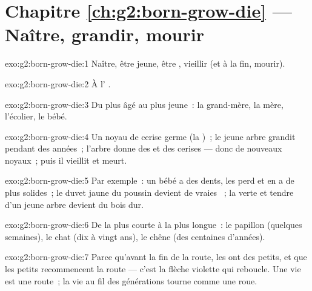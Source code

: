 \section*{Chapitre \ref{ch:g2:born-grow-die} --- Naître, grandir, mourir}

\begin{solution}{exo:g2:born-grow-die:1}
Naître, être jeune, être , vieillir (et à la fin, mourir).
\end{solution}

\begin{solution}{exo:g2:born-grow-die:2}
À l' .
\end{solution}

\begin{solution}{exo:g2:born-grow-die:3}
Du plus âgé au plus jeune~: la grand-mère, la mère, l'écolier, le
bébé.
\end{solution}

\begin{solution}{exo:g2:born-grow-die:4}
Un noyau de cerise germe (la )~; le jeune arbre grandit
pendant des années~; l'arbre  donne des  et des cerises
--- donc de nouveaux noyaux~; puis il vieillit et meurt.
\end{solution}

\begin{solution}{exo:g2:born-grow-die:5}
Par exemple~: un bébé a des dents, les perd et en a de plus
solides~; le duvet jaune du poussin devient de vraies ~; la
 verte et tendre d'un jeune arbre devient du bois dur.
\end{solution}

\begin{solution}{exo:g2:born-grow-die:6}
De la plus courte à la plus longue~: le papillon (quelques
semaines), le chat (dix à vingt ans), le chêne (des centaines
d'années).
\end{solution}

\begin{solution}{exo:g2:born-grow-die:7}
Parce qu'avant la fin de la route, les  ont des petits, et
que les petits recommencent la route --- c'est la flèche violette
qui reboucle. Une vie est une route~; la vie au fil des générations
tourne comme une roue.
\end{solution}

